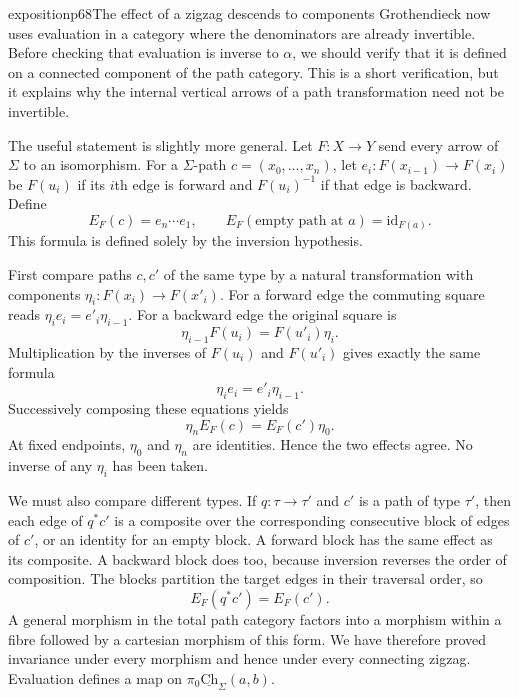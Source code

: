 

\begin{dcomment}{exposition}{p68}{The effect of a zigzag descends to components}
Grothendieck now uses evaluation in a category where the denominators are already invertible. Before checking that evaluation is inverse to $\alpha$, we should verify that it is defined on a connected component of the path category. This is a short verification, but it explains why the internal vertical arrows of a path transformation need not be invertible.

The useful statement is slightly more general. Let $F:X\to Y$ send every arrow of $\Sigma$ to an isomorphism. For a $\Sigma$-path
$c=(x_0,\ldots,x_n)$, let
$e_i:F(x_{i-1})\to F(x_i)$ be $F(u_i)$ if its $i$th edge is forward and $F(u_i)^{-1}$ if that edge is backward. Define
\[
 E_F(c)=e_n\cdots e_1,
 \qquad E_F(\text{empty path at }a)=\mathrm{id}_{F(a)}.
\]
This formula is defined solely by the inversion hypothesis.

First compare paths $c,c'$ of the same type by a natural transformation with components $\eta_i:F(x_i)\to F(x'_i)$. For a forward edge the commuting square reads
$\eta_i e_i=e'_i\eta_{i-1}$. For a backward edge the original square is
\[
 \eta_{i-1}F(u_i)=F(u'_i)\eta_i.
\]
Multiplication by the inverses of $F(u_i)$ and $F(u'_i)$ gives exactly the same formula
\[
 \eta_i e_i=e'_i\eta_{i-1}.
\]
Successively composing these equations yields
\[
 \eta_n E_F(c)=E_F(c')\eta_0.
\]
At fixed endpoints, $\eta_0$ and $\eta_n$ are identities. Hence the two effects agree. No inverse of any $\eta_i$ has been taken.

We must also compare different types. If $q:\tau\to\tau'$ and $c'$ is a path of type $\tau'$, then each edge of $q^*c'$ is a composite over the corresponding consecutive block of edges of $c'$, or an identity for an empty block. A forward block has the same effect as its composite. A backward block does too, because inversion reverses the order of composition. The blocks partition the target edges in their traversal order, so
\[
 E_F(q^*c')=E_F(c').
\]
A general morphism in the total path category factors into a morphism within a fibre followed by a cartesian morphism of this form. We have therefore proved invariance under every morphism and hence under every connecting zigzag. Evaluation defines a map on $\pi_0\underline{\mathrm{Ch}}_\Sigma(a,b)$.


\end{dcomment}
